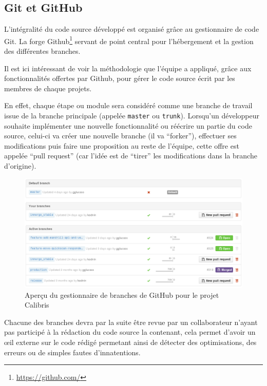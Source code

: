 \documentclass[12pt,a4paper]{book}
\begin{document}
\subsection{Git et GitHub}

\label{sec.git}

L'intégralité du code source développé est organisé grâce au gestionnaire de code Git. La forge Github\footnote{\url{https://github.com/}} servant de point central pour l'hébergement et la gestion des différentes branches.

Il est ici intéressant de voir la méthodologie que l'équipe a appliqué, grâce aux fonctionnalités offertes par Github, pour gérer le code source écrit par les membres de chaque projets.

En effet, chaque étape ou module sera considéré comme une branche de travail issue de la branche principale (appelée \texttt{master} ou \texttt{trunk}). Lorsqu'un développeur souhaite implémenter une nouvelle fonctionnalité ou réécrire un partie du code source, celui-ci va créer une nouvelle branche (il va ``forker''), effectuer ses modifications puis faire une proposition au reste de l'équipe, cette offre est appelée ``pull request'' (car l'idée est de ``tirer'' les modifications dans la branche d'origine).

\begin{figure}[htp]
\centering
\includegraphics[scale=.50]{img/branches.png}
 \caption{Aperçu du gestionnaire de branches de GitHub pour le projet Calibris}
 \label{fig.jira_agile1}
\end{figure}

Chacune des branches devra par la suite être revue par un collaborateur n'ayant pas participé à la rédaction du code source la contenant, cela permet d'avoir un œil externe sur le code rédigé permetant ainsi de détecter des optimisations, des erreurs ou de simples fautes d'innatentions.
\end{document}
